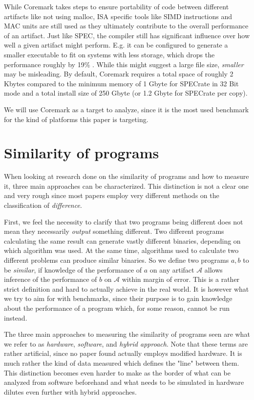 \documentclass[../bachelor_paper.tex]{subfiles}
\begin{document}
While Coremark takes steps to ensure portability of code between different artifacts like not using malloc, \ac{ISA} specific tools like \ac{SIMD} instructions and \ac{MAC unit}s are still used as they ultimately contribute to the overall performance of an artifact. Just like \ac{SPEC}, the compiler still has significant influence over how well a given artifact might perform. E.g. it can be configured to generate a smaller executable to fit on systems with less storage, which drops the performance roughly by 19\% \cite{gal-onExploringCoremarkBenchmark2012}. While this might suggest a large file size, \textit{smaller} may be misleading. By default, Coremark requires a total space of roughly 2 Kbytes compared to the minimum memory of 1 Gbyte for \ac{SPEC}rate in 32 Bit mode and a total install size of 250 Gbyte (or 1.2 Gbyte for \ac{SPEC}rate per copy). \cite{SystemRequirementsCPU}

We will use Coremark as a target to analyze, since it is the most used benchmark for the kind of platforms this paper is targeting.

\section{Similarity of programs}
	\label{ch:theo/simi}
When looking at research done on the similarity of programs and how to measure it, three main approaches can be characterized. This distinction is not a clear one and very rough since most papers employ very different methods on the classification of \textit{difference}. 

First, we feel the necessity to clarify that two programs being different does not mean they necessarily \textit{output} something different. Two different programs calculating the same result can generate vastly different binaries, depending on which algorithm was used. At the same time, algorithms used to calculate two different problems can produce similar binaries. So we define two programs $a,b$ to be \textit{similar}, if knowledge of the performance of $a$ on any artifact $\mathcal{A}$ allows inference of the performance of $b$ on $\mathcal{A}$ within margin of error. This is a rather strict definition and hard to actually achieve in the real world. It is however what we try to aim for with benchmarks, since their purpose is to gain knowledge about the performance of a program which, for some reason, cannot be run instead.

The three main approaches to measuring the similarity of programs seen are what we refer to as \textit{hardware}, \textit{software}, and \textit{hybrid approach}. Note that these terms are rather artificial, since no paper found actually employs modified hardware. It is much rather the kind of data measured which defines the "line" between them. This distinction becomes even harder to make as the border of what can be analyzed from software beforehand and what needs to be simulated in hardware dilutes even further with hybrid approaches.
\end{document}
